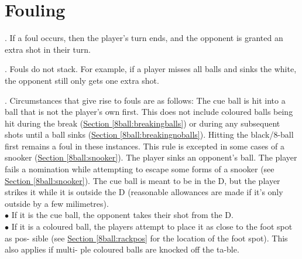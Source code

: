 \section{Fouling} \label{8ball:fouling}
\ex. If a foul occurs, then the player's turn ends, and the opponent is granted an extra shot in their turn.\par
\ex. Fouls do not stack. For example, if a player misses all balls and sinks the white, the opponent still only gets one extra shot.\par
\ex. Circumstances that give rise to fouls are as follows:\itemspace
{}The cue ball is hit into a ball that is not the player's own first. This does not include coloured balls being hit during the break (\hyperref[8ball:breakingballs]{Section \ref*{8ball:breakingballs}}) or during any subsequent shots until a ball sinks (\hyperref[8ball:breakingnoballs]{Section \ref*{8ball:breakingnoballs}}). Hitting the black/8-ball first remains a foul in these instances. This rule is excepted in some cases of a snooker (\hyperref[8ball:snooker]{Section \ref*{8ball:snooker}}).\itemspace
{}\CueBallMiss\itemspace
{}\CueBallSink\itemspace
{}The player sinks an opponent's ball.\itemspace
{}\CueBallRail\itemspace
{}\CueBallPreemptive\itemspace
{}The player fails a nomination while attempting to escape some forms of a snooker (see \hyperref[8ball:snooker]{Section \ref*{8ball:snooker}}).\itemspace
{}The cue ball is meant to be in the D, but the player strikes it while it is outside the D (reasonable allowances are made if it's only outside by a few milimetres).\itemspace
{}\PushShot\itemspace
{}\ObjectBallTouch\itemspace
{}\label{8ball:ballofftable}\BallOffTable\\
                   \hspace*{1.74em}$\bullet$\hspace*{0.0em} If it is the cue ball, the opponent takes \hspace*{2.68em}their shot from the D.\\%
                   \hspace*{1.74em}$\bullet$\hspace*{0.15em} If it is a coloured ball, the players attempt \hspace*{2.68em}to place it as close to the foot spot as pos- \hspace*{2.68em}sible (see \hyperref[8ball:rackpos]{Section \ref*{8ball:rackpos}} for the location of \hspace*{2.68em}the foot spot). This also applies if multi- \hspace*{2.68em}ple coloured balls are knocked off the ta-\hspace*{2.68em}ble.\\%
